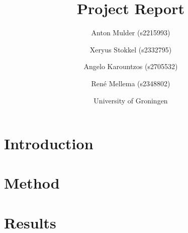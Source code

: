 \documentclass{article}
\title{\textbf{\huge Project Report}}
\author{Anton Mulder (s2215993) \and Xeryus Stokkel (s2332795) \and Angelo
    Karountzos (s2705532) \and Ren\'e Mellema (s2348802)}
\date{University of Groningen}
\begin{document}
\maketitle

\begin{abstract}
    \noindent
\end{abstract}

\section{Introduction}


\section{Method}


\section{Results}


%



\end{document}
